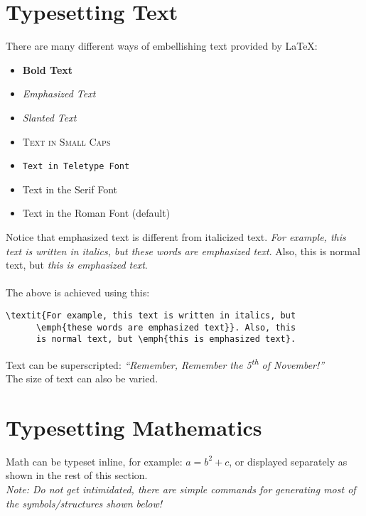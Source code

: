 \documentclass[a4paper,10pt,titlepage]{article}
\begin{document}
\section{Typesetting Text}

There are many different ways of embellishing text provided by
\LaTeX{}:

\begin{itemize}
\item \textbf{Bold Text}
\item \emph{Emphasized Text}
\item \textsl{Slanted Text}
\item \textsc{Text in Small Caps}
\item \texttt{Text in Teletype Font}
\item \textsf{Text in the Serif Font}
\item \textrm{Text in the Roman Font (default)}
\end{itemize}
Notice that emphasized text is different from italicized text. \textit{For example, this text is written in italics, but \emph{these words are
    emphasized text}}. Also, this is normal text, but \emph{this is emphasized text}.
\paragraph{}
The above is achieved using this: 
\begin{verbatim}
\textit{For example, this text is written in italics, but 
      \emph{these words are emphasized text}}. Also, this 
      is normal text, but \emph{this is emphasized text}.
\end{verbatim}
Text can be superscripted: \textit{``Remember, Remember the 5\textsuperscript{th} of November!''}\\

The {\Large size} of {\scriptsize text} can {\LARGE also} be {\Huge
  varied}.

\section{Typesetting Mathematics}

Math can be typeset inline, for example: $a= b^2 + c$, or displayed
separately as shown in the rest of this section.\\

\noindent \textit{Note: Do not get intimidated, there are simple commands for
  generating most of the symbols/structures shown below!}
\end{document}
